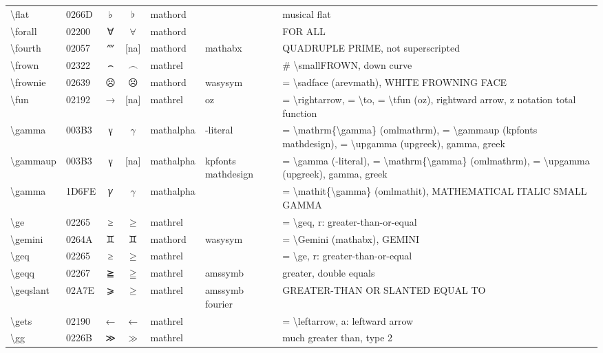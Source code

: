 \documentclass[a4paper,landscape]{article}
\begin{document}
\begin{longtable}{llcclll}
\textbackslash{}flat & 0266D & ♭ & $\flat$ & mathord &  & musical flat \\
\textbackslash{}forall & 02200 & ∀ & $\forall$ & mathord &  & FOR ALL \\
\textbackslash{}fourth & 02057 & ⁗ & [na] & mathord & mathabx & QUADRUPLE PRIME, not superscripted \\
\textbackslash{}frown & 02322 & ⌢ & $\frown$ & mathrel &  & \# \textbackslash{}smallFROWN, down curve \\
\textbackslash{}frownie & 02639 & ☹ & $\frownie$ & mathord & wasysym & = \textbackslash{}sadface (arevmath), WHITE FROWNING FACE \\
\textbackslash{}fun & 02192 & → & [na] & mathrel & oz & = \textbackslash{}rightarrow, = \textbackslash{}to,  = \textbackslash{}tfun (oz),  rightward arrow,  z notation total function \\
\textbackslash{}gamma & 003B3 & γ & $\gamma$ & mathalpha & -literal & = \textbackslash{}mathrm\{\textbackslash{}gamma\} (omlmathrm), = \textbackslash{}gammaup (kpfonts mathdesign), = \textbackslash{}upgamma (upgreek), gamma, greek \\
\textbackslash{}gammaup & 003B3 & γ & [na] & mathalpha & kpfonts mathdesign & = \textbackslash{}gamma (-literal), = \textbackslash{}mathrm\{\textbackslash{}gamma\} (omlmathrm),  = \textbackslash{}upgamma (upgreek),  gamma,  greek \\
\textbackslash{}gamma & 1D6FE & 𝛾 & $\gamma$ & mathalpha &  & = \textbackslash{}mathit\{\textbackslash{}gamma\} (omlmathit), MATHEMATICAL ITALIC SMALL GAMMA \\
\textbackslash{}ge & 02265 & ≥ & $\ge$ & mathrel &  & = \textbackslash{}geq,  r: greater-than-or-equal \\
\textbackslash{}gemini & 0264A & \textsf ♊ & $\gemini$ & mathord & wasysym & = \textbackslash{}Gemini (mathabx), GEMINI \\
\textbackslash{}geq & 02265 & ≥ & $\geq$ & mathrel &  & = \textbackslash{}ge, r: greater-than-or-equal \\
\textbackslash{}geqq & 02267 & ≧ & $\geqq$ & mathrel & amssymb & greater, double equals \\
\textbackslash{}geqslant & 02A7E & ⩾ & $\geqslant$ & mathrel & amssymb fourier & GREATER-THAN OR SLANTED EQUAL TO \\
\textbackslash{}gets & 02190 & ← & $\gets$ & mathrel &  & = \textbackslash{}leftarrow,  a: leftward arrow \\
\textbackslash{}gg & 0226B & ≫ & $\gg$ & mathrel &  & much greater than, type 2 \\

\end{longtable}
\end{document}
